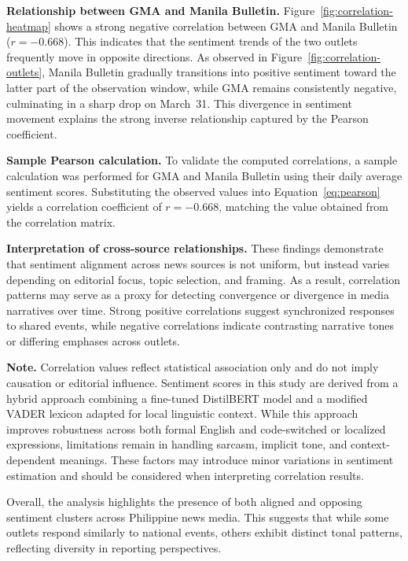 \documentclass[sigconf, nonacm]{acmart}
\begin{document}
\textbf{Relationship between GMA and Manila Bulletin.}
Figure~\ref{fig:correlation-heatmap} shows a strong negative correlation between GMA and Manila Bulletin ($r=-0.668$). This indicates that the sentiment trends of the two outlets frequently move in opposite directions. As observed in Figure~\ref{fig:correlation-outlets}, Manila Bulletin gradually transitions into positive sentiment toward the latter part of the observation window, while GMA remains consistently negative, culminating in a sharp drop on March~31. This divergence in sentiment movement explains the strong inverse relationship captured by the Pearson coefficient.

\textbf{Sample Pearson calculation.}
To validate the computed correlations, a sample calculation was performed for GMA and Manila Bulletin using their daily average sentiment scores. Substituting the observed values into Equation~\ref{eq:pearson} yields a correlation coefficient of $r = -0.668$, matching the value obtained from the correlation matrix.

\textbf{Interpretation of cross-source relationships.}
These findings demonstrate that sentiment alignment across news sources is not uniform, but instead varies depending on editorial focus, topic selection, and framing. As a result, correlation patterns may serve as a proxy for detecting convergence or divergence in media narratives over time. Strong positive correlations suggest synchronized responses to shared events, while negative correlations indicate contrasting narrative tones or differing emphases across outlets.

\textbf{Note.}
Correlation values reflect statistical association only and do not imply causation or editorial influence. Sentiment scores in this study are derived from a hybrid approach combining a fine-tuned DistilBERT model and a modified VADER lexicon adapted for local linguistic context. While this approach improves robustness across both formal English and code-switched or localized expressions, limitations remain in handling sarcasm, implicit tone, and context-dependent meanings. These factors may introduce minor variations in sentiment estimation and should be considered when interpreting correlation results.

Overall, the analysis highlights the presence of both aligned and opposing sentiment clusters across Philippine news media. This suggests that while some outlets respond similarly to national events, others exhibit distinct tonal patterns, reflecting diversity in reporting perspectives.
\end{document}
